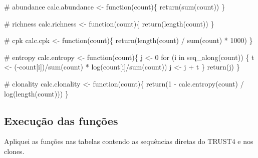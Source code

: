 \documentclass[
  letterpaper,
  DIV=11,
  numbers=noendperiod]{scrartcl}
\newenvironment{Shaded}{\begin{snugshade}}{\end{snugshade}}
\newcommand{\CommentTok}[1]{\textcolor[rgb]{0.37,0.37,0.37}{#1}}
\newcommand{\ControlFlowTok}[1]{\textcolor[rgb]{0.00,0.23,0.31}{#1}}
\newcommand{\DecValTok}[1]{\textcolor[rgb]{0.68,0.00,0.00}{#1}}
\newcommand{\FunctionTok}[1]{\textcolor[rgb]{0.28,0.35,0.67}{#1}}
\newcommand{\NormalTok}[1]{\textcolor[rgb]{0.00,0.23,0.31}{#1}}
\newcommand{\OtherTok}[1]{\textcolor[rgb]{0.00,0.23,0.31}{#1}}
\newcommand{\SpecialCharTok}[1]{\textcolor[rgb]{0.37,0.37,0.37}{#1}}
\begin{document}
\begin{Shaded}
\begin{Highlighting}[]
\CommentTok{\# abundance}
\NormalTok{calc.abundance }\OtherTok{\textless{}{-}} \ControlFlowTok{function}\NormalTok{(count)\{}
  \FunctionTok{return}\NormalTok{(}\FunctionTok{sum}\NormalTok{(count))}
\NormalTok{\}}

\CommentTok{\# richness}
\NormalTok{calc.richness }\OtherTok{\textless{}{-}} \ControlFlowTok{function}\NormalTok{(count)\{}
  \FunctionTok{return}\NormalTok{(}\FunctionTok{length}\NormalTok{(count))}
\NormalTok{\}}

\CommentTok{\# cpk}
\NormalTok{calc.cpk }\OtherTok{\textless{}{-}} \ControlFlowTok{function}\NormalTok{(count)\{}
  \FunctionTok{return}\NormalTok{(}\FunctionTok{length}\NormalTok{(count) }\SpecialCharTok{/} \FunctionTok{sum}\NormalTok{(count) }\SpecialCharTok{*} \DecValTok{1000}\NormalTok{)}
\NormalTok{\}}

\CommentTok{\# entropy}
\NormalTok{calc.entropy }\OtherTok{\textless{}{-}} \ControlFlowTok{function}\NormalTok{(count)\{}
\NormalTok{  j }\OtherTok{\textless{}{-}} \DecValTok{0}
  \ControlFlowTok{for}\NormalTok{ (i }\ControlFlowTok{in} \FunctionTok{seq\_along}\NormalTok{(count)) \{}
\NormalTok{    t }\OtherTok{\textless{}{-}}\NormalTok{ (}\SpecialCharTok{{-}}\NormalTok{count[i])}\SpecialCharTok{/}\FunctionTok{sum}\NormalTok{(count) }\SpecialCharTok{*} \FunctionTok{log}\NormalTok{(count[i]}\SpecialCharTok{/}\FunctionTok{sum}\NormalTok{(count))}
\NormalTok{    j }\OtherTok{\textless{}{-}}\NormalTok{ j }\SpecialCharTok{+}\NormalTok{ t}
\NormalTok{  \}}
  \FunctionTok{return}\NormalTok{(j)}
\NormalTok{\}}

\CommentTok{\# clonality}
\NormalTok{calc.clonality }\OtherTok{\textless{}{-}} \ControlFlowTok{function}\NormalTok{(count)\{}
  \FunctionTok{return}\NormalTok{(}\DecValTok{1} \SpecialCharTok{{-}} \FunctionTok{calc.entropy}\NormalTok{(count) }\SpecialCharTok{/} \FunctionTok{log}\NormalTok{(}\FunctionTok{length}\NormalTok{(count)))}
\NormalTok{\}}
\end{Highlighting}
\end{Shaded}

\hypertarget{execuuxe7uxe3o-das-funuxe7uxf5es}{%
\subsection{Execução das
funções}\label{execuuxe7uxe3o-das-funuxe7uxf5es}}

Apliquei as funções nas tabelas contendo as sequências diretas do TRUST4
e nos clones.
\end{document}
